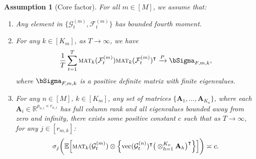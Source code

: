 \documentclass[aos]{imsart}
\theoremstyle{plain}
\newtheorem{assumption}{Assumption}
\theoremstyle{definition}
\def\mat{\textnormal{\textsc{mat}}}
\def\E{\mathbb{E}}
\def\R{\mathbb{R}}
\def\cF{\mathcal{F}}
\def\cG{\mathcal{G}} \def\cH{\boldsymbol{\mathcal{H}}} \def\cI{\mathcal{I}}
\def\bA{\mathbf{A}}
\def\trans{\intercal}
\def\vec{\mathrm{vec}}
\begin{document}
\begin{assumption}[Core factor]\label{ass: core_factor}
For all $m\in[M]$, we assume that:
\begin{enumerate}[itemsep=0pt, label = (\alph*), left = 0pt]
    \item Any element in $\big\{ \cG_t^{(m)}, \cF_t^{(m)} \big\}$ has bounded fourth moment.
    \item For any $k\in[K_m]$, as $T\to\infty$, we have
    \[
    \frac{1}{T} \sum_{t=1}^T \mat_k(\cF_t^{(m)}) \mat_k(\cF_t^{(m)})^\trans \xrightarrow{P} \bSigma_{F,m,k} ,
    \]
    where $\bSigma_{F,m,k}$ is a positive definite matrix with finite eigenvalues.
    \item For any $n\in [M]$, $k\in[K_m]$, any set of matrices $\{ \bA_1, \dots, \bA_{K_n}\}$, where each $\bA_i\in \R^{p_{n,i} \times r_{n,i}}$ has full column rank and all eigenvalues bounded away from zero and infinity, there exists some positive constant $c$ such that as $T\to\infty$, for any $j\in[r_{m,k}]$:
    \[
    \sigma_{j}\bigg( \E\Big[ \mat_k(\cG_t^{(m)}) \otimes \Big\{ \vec(\cG_t^{(n)})^\trans \big( \otimes_{h=1}^{K_n} \bA_{h} \big)^\trans \Big\} \Big] \bigg) \asymp c .
    \]
\end{enumerate}
\end{assumption}
\end{document}
